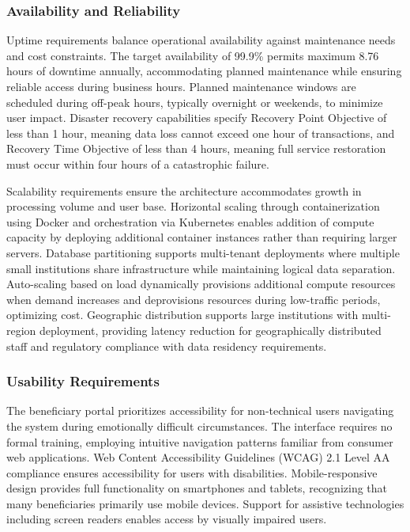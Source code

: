 \subsubsection{Availability and Reliability}

Uptime requirements balance operational availability against maintenance needs and cost constraints. The target availability of 99.9\% permits maximum 8.76 hours of downtime annually, accommodating planned maintenance while ensuring reliable access during business hours. Planned maintenance windows are scheduled during off-peak hours, typically overnight or weekends, to minimize user impact. Disaster recovery capabilities specify Recovery Point Objective of less than 1 hour, meaning data loss cannot exceed one hour of transactions, and Recovery Time Objective of less than 4 hours, meaning full service restoration must occur within four hours of a catastrophic failure.

Scalability requirements ensure the architecture accommodates growth in processing volume and user base. Horizontal scaling through containerization using Docker and orchestration via Kubernetes enables addition of compute capacity by deploying additional container instances rather than requiring larger servers. Database partitioning supports multi-tenant deployments where multiple small institutions share infrastructure while maintaining logical data separation. Auto-scaling based on load dynamically provisions additional compute resources when demand increases and deprovisions resources during low-traffic periods, optimizing cost. Geographic distribution supports large institutions with multi-region deployment, providing latency reduction for geographically distributed staff and regulatory compliance with data residency requirements.

\subsubsection{Usability Requirements}

The beneficiary portal prioritizes accessibility for non-technical users navigating the system during emotionally difficult circumstances. The interface requires no formal training, employing intuitive navigation patterns familiar from consumer web applications. Web Content Accessibility Guidelines (WCAG) 2.1 Level AA compliance ensures accessibility for users with disabilities. Mobile-responsive design provides full functionality on smartphones and tablets, recognizing that many beneficiaries primarily use mobile devices. Support for assistive technologies including screen readers enables access by visually impaired users.

